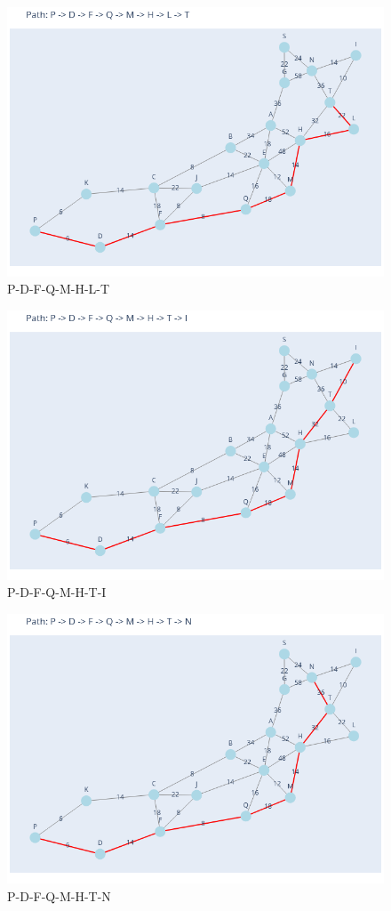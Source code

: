\documentclass[11pt]{book}
\renewcommand{\=}[1]{\stackrel{#1}{=}} %
\theoremstyle{definition}
\theoremstyle{remark}
\begin{document}
\begin{figure}
    \centering
    \includegraphics[width=0.7\linewidth]{Plots/P_D_F_Q_M_H_L_T.png}
    \caption{P-D-F-Q-M-H-L-T}
    \label{fig:enter-label}
\end{figure}
\begin{figure}
    \centering
    \includegraphics[width=0.7\linewidth]{Plots/P_D_F_Q_M_H_T_I.png}
    \caption{P-D-F-Q-M-H-T-I}
    \label{fig:enter-label}
\end{figure}
\begin{figure}
    \centering
    \includegraphics[width=0.7\linewidth]{Plots/P_D_F_Q_M_H_T_N.png}
    \caption{P-D-F-Q-M-H-T-N}
    \label{fig:enter-label}
\end{figure}
\end{document}
